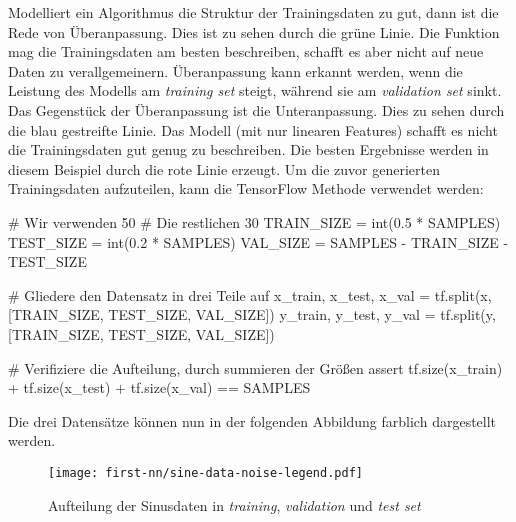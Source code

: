\noindent
Modelliert ein Algorithmus die Struktur der Trainingsdaten zu gut, dann
ist die Rede von Überanpassung. Dies ist zu sehen
durch die grüne Linie. Die Funktion mag die Trainingsdaten
am besten beschreiben, schafft es aber nicht auf neue
Daten zu verallgemeinern.
Überanpassung kann erkannt werden, wenn die Leistung des Modells am
\textit{training set} steigt, während sie am \textit{validation set}
sinkt. Das Gegenstück der Überanpassung ist die
Unteranpassung. Dies zu sehen durch die blau gestreifte Linie.
Das Modell (mit nur linearen Features)
schafft es nicht die Trainingsdaten gut genug zu beschreiben.
Die besten Ergebnisse werden in diesem Beispiel durch die rote Linie erzeugt.
Um die zuvor generierten Trainingsdaten aufzuteilen,
kann die TensorFlow Methode 
verwendet werden:
\begin{pythoncode}
# Wir verwenden 50%
# Die restlichen 30%
TRAIN_SIZE = int(0.5 * SAMPLES)
TEST_SIZE = int(0.2 * SAMPLES)
VAL_SIZE = SAMPLES - TRAIN_SIZE - TEST_SIZE

# Gliedere den Datensatz in drei Teile auf
x_train, x_test, x_val = tf.split(x, [TRAIN_SIZE, TEST_SIZE, VAL_SIZE])
y_train, y_test, y_val = tf.split(y, [TRAIN_SIZE, TEST_SIZE, VAL_SIZE])

# Verifiziere die Aufteilung, durch summieren der Größen
assert tf.size(x_train) + tf.size(x_test) + tf.size(x_val) == SAMPLES
\end{pythoncode}
Die drei Datensätze können nun in der folgenden Abbildung farblich dargestellt werden.
\begin{figure}[h!]
  \centering
  \texttt{[image: first-nn/sine-data-noise-legend.pdf]}
  \caption{Aufteilung der Sinusdaten in
  \textit{training}, \textit{validation} und \textit{test set}}
\end{figure}

